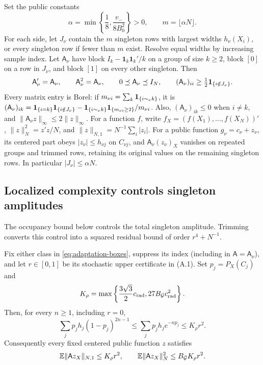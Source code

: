 Set the public constants
\begin{equation}
 \alpha=\min\left\{\frac18,\frac{v_-}{8B_0^2}\right\}>0,
 \qquad m=\lfloor\alpha N\rfloor.
 \label{eq:adaptation-trimming-fraction}
\end{equation}
For each side, let $J_\nu$ contain the $m$ singleton rows with largest
widths $h_\nu(X_i)$, or every singleton row if fewer than $m$ exist.
Resolve equal widths by increasing sample index. Let $\mathsf A_\nu$
have block $I_k-\mathbf1_k\mathbf1_k'/k$ on a group of size $k\ge2$,
block $[0]$ on a row in $J_\nu$, and block $[1]$ on every other
singleton. Then
\begin{equation}
 \mathsf A_\nu'=\mathsf A_\nu,\qquad \mathsf A_\nu^2=\mathsf A_\nu,
 \qquad 0\preceq\mathsf A_\nu\preceq I_N,\qquad
 (\mathsf A_\nu)_{ii}\ge\tfrac12\mathbf 1_{\{i\notin J_\nu\}}.
 \label{eq:adaptation-projection}
\end{equation}
Every matrix entry is Borel: if
$m_{\nu i}=\sum_k\mathbf 1_{\{i\sim_\nu k\}}$, it is
$(\mathsf A_\nu)_{ik}=\mathbf 1_{\{i=k\}}\mathbf 1_{\{i\notin J_\nu\}}-
 \mathbf 1_{\{i\sim_\nu k\}}\mathbf 1_{\{m_{\nu i}\ge2\}}/m_{\nu i}$.
Also, $(\mathsf A_\nu)_{ik}\le0$ when $i\ne k$, and
$\|\mathsf A_\nu z\|_\infty\le2\|z\|_\infty$.
For a function $f$, write $f_X=(f(X_1),\ldots,f(X_N))'$,
$\|z\|_N^2=z'z/N$, and $\|z\|_{N,1}=N^{-1}\sum_i|z_i|$.
For a public function $g_\nu=c_\nu+z_\nu$, its centered part obeys
$|z_\nu|\le h_{\nu j}$ on $C_{\nu j}$, and
$\mathsf A_\nu(z_\nu)_X$ vanishes
on repeated groups and trimmed rows, retaining its original values on
the remaining singleton rows. In particular $|J_\nu|\le\alpha N$.

\subsection{Localized complexity controls singleton amplitudes}

The occupancy bound below controls the total singleton amplitude.
Trimming converts this control into a squared residual bound of order
$r^4+N^{-1}$.

\begin{lemma}
\label{lem:adaptation-occupancy}
Fix either class in \eqref{eq:adaptation-boxes}, suppress its index
(including in $\mathsf A=\mathsf A_\nu$), and
let $r\in[0,1]$ be its stochastic upper certificate in (A.1). Set
$p_j=P_X(C_j)$ and
\[
 K_\rho=\max\left\{\frac{3\sqrt3}{2}c_{\rm rad},
                         27B_{\mathcal G}c_{\rm rad}^2\right\}.
\]
Then, for every $n\ge1$, including $r=0$,
\begin{equation}
 \sum_jp_jh_j(1-p_j)^{2n-1}
 \le \sum_jp_jh_j e^{-np_j}\le K_\rho r^2.
 \label{eq:adaptation-singleton-mass}
\end{equation}
Consequently every fixed centered public function $z$ satisfies
\begin{equation}
 \mathbb E\|\mathsf A z_X\|_{N,1}\le K_\rho r^2,
 \qquad
 \mathbb E\|\mathsf A z_X\|_N^2\le B_{\mathcal G}K_\rho r^2.
 \label{eq:adaptation-residual-moments}
\end{equation}
\end{lemma}

